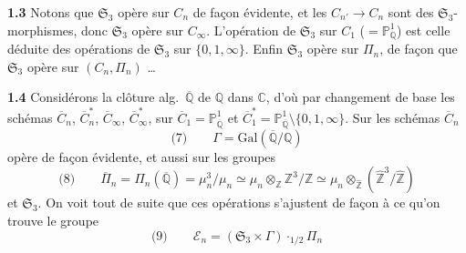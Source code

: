 \documentclass[11pt,a4paper]{article}
\begin{document}
\textbf{1.3} Notons que $\mathfrak{S}_3$ opère sur $C_n$ de façon évidente, et les $C_{n'} \to C_n$ sont des $\mathfrak{S}_3$-morphismes, donc $\mathfrak{S}_3$ opère sur $C_\infty$. L'opération de $\mathfrak{S}_3$ sur $C_1$ ($= \mathbb{P}^{1}_{\mathbb{Q}}$) est celle déduite des opérations de $\mathfrak{S}_3$ sur $\{0, 1, \infty\}$. Enfin $\mathfrak{S}_3$ opère sur $\Pi_n$, de façon que $\mathfrak{S}_3$ opère sur $(C_n, \Pi_n)$ \ldots{} 

\textbf{1.4} Considérons la clôture alg.\ $\overline{\mathbb{Q}}$ de $\mathbb{Q}$ dans $\mathbb{C}$, d'où par changement de base les schémas $\overline{C}_n$, $\overline{C}_n^{*}$, $\overline{C}_\infty$, $\overline{C}_\infty^{*}$, sur $\overline{C}_1 = \mathbb{P}^{1}_{\overline{\mathbb{Q}}}$ et $\overline{C}_1^{*} = \mathbb{P}^{1}_{\overline{\mathbb{Q}}} \setminus \{0, 1, \infty\}$. Sur les schémas $\overline{C}_n$ \struck{\ill{}}
\[
  \text{(7)} \qquad \Gamma = \mathrm{Gal}(\overline{\mathbb{Q}}/\mathbb{Q})
\]
opère de façon évidente, et aussi sur les groupes
\[
  \text{(8)} \qquad \overline{\Pi}_n = \Pi_n(\overline{\mathbb{Q}}) = \mu_n^{3}/\mu_n \simeq \mu_n \otimes_{\mathbb{Z}} \mathbb{Z}^{3}/\mathbb{Z} \simeq \mu_n \otimes_{\widehat{\mathbb{Z}}} (\widehat{\mathbb{Z}}^{3}/\widehat{\mathbb{Z}})
\]
et $\mathfrak{S}_3$. On voit tout de suite que ces opérations s'ajustent de façon à ce qu'on trouve le groupe
\[
  \text{(9)} \qquad \mathcal{E}_n = (\mathfrak{S}_3 \times \Gamma) \cdot_{1/2} \Pi_n
\]
\end{document}
